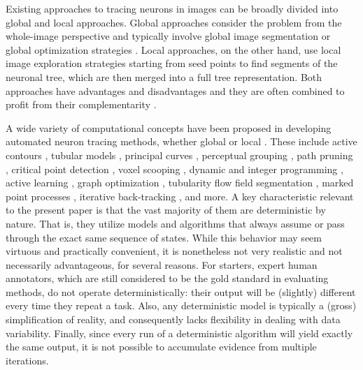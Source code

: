Existing approaches to tracing neurons in images can be broadly divided into global and local approaches. Global approaches consider the problem from the whole-image perspective and typically involve global image segmentation \cite{wearne2005new, basu2013segmentation, de2016graph} or global optimization strategies \cite{turetken2011automated, xiao2013app2}. Local approaches, on the other hand, use local image exploration strategies starting from seed points \cite{peng2011automatic, choromanska2012automatic, yang2013distance} to find segments of the neuronal tree, which are then merged into a full tree representation. Both approaches have advantages and disadvantages and they are often combined to profit from their complementarity \cite{zhao2011automated, jimenez2015improved}.

A wide variety of computational concepts have been proposed in developing automated neuron tracing methods, whether global or local \cite{acciai2016automated}. These include active contours \cite{cai2006repulsive, wang2011broadly, luo2015neuron}, tubular models \cite{santamaria2015automatic}, principal curves \cite{bas2011principal, quan2015neurogps}, perceptual grouping \cite{narayanaswamy20113}, path pruning \cite{peng2011automatic, xiao2013app2}, critical point detection \cite{al2008improved, radojevic2015fuzzy}, voxel scooping \cite{rodriguez2009three}, dynamic and integer programming \cite{zhang2007automated, turetken2012automated}, active learning \cite{gala2014active}, graph optimization \cite{turetken2011automated, chothani2011automated}, tubularity flow field segmentation \cite{mukherjee2015tubularity}, marked point processes \cite{basu2016neurite}, iterative back-tracking \cite{liu2016rivulet}, and more. A key characteristic relevant to the present paper is that the vast majority of them are deterministic by nature. That is, they utilize models and algorithms that always assume or pass through the exact same sequence of states. While this behavior may seem virtuous and practically convenient, it is nonetheless not very realistic and not necessarily advantageous, for several reasons. For starters, expert human annotators, which are still considered to be the gold standard in evaluating methods, do not operate deterministically: their output will be (slightly) different every time they repeat a task. Also, any deterministic model is typically a (gross) simplification of reality, and consequently lacks flexibility in dealing with data variability. Finally, since every run of a deterministic algorithm will yield exactly the same output, it is not possible to accumulate evidence from multiple iterations. 

